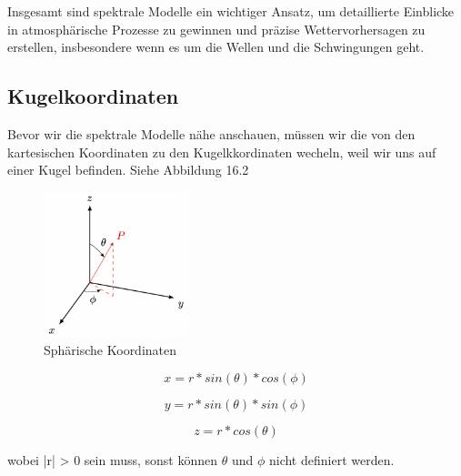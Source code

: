 Insgesamt sind spektrale Modelle ein wichtiger Ansatz, um detaillierte Einblicke in atmosphärische Prozesse zu gewinnen und präzise Wettervorhersagen zu erstellen, insbesondere wenn es um die Wellen und die Schwingungen geht.

\subsection{Kugelkoordinaten
\label{spektral:subsection:kugelkoordinaten}}

Bevor wir die spektrale Modelle nähe anschauen, müssen wir die von den kartesischen Koordinaten zu den Kugelkkordinaten wecheln, weil wir uns auf einer Kugel befinden. Siehe Abbildung 16.2

\begin{figure}
	\centering
	\includegraphics[height=120pt,width=120pt]{papers/spektral/images/spherical_coordinates.png}
	\caption{Sphärische Koordinaten}
    \label{spektral:fig:sphericalcoords}
\end{figure}

\begin{equation}
 x = r*sin(\theta)*cos(\phi)
\label{spektral:equation4}
\end{equation}

\begin{equation}
 y = r*sin(\theta)*sin(\phi)
\label{spektral:equation5}
\end{equation}

\begin{equation}
 z = r*cos(\theta)
\label{spektral:equation6}
\end{equation}

wobei |r| > 0 sein muss, sonst können $\theta$ und $\phi$ nicht definiert werden.


